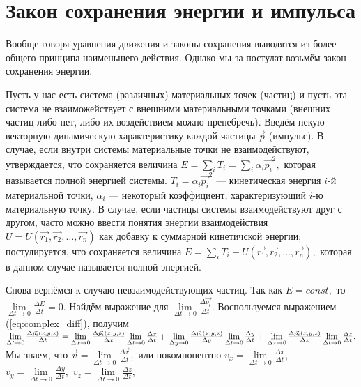\section{Закон сохранения энергии и импульса}
Вообще говоря уравнения движения и законы сохранения выводятся из более общего принципа
наименьшего действия. Однако мы за постулат возьмём закон сохранения энергии.\par
Пусть у нас есть система (различных) материальных точек (частиц) и пусть эта система не взаиможействует
с внешними материальными точками (внешних частиц либо нет, либо их воздействием можно
пренебречь). Введём некую векторную динамическую характеристику каждой частицы $\vec{p}$ (импульс).
В случае, если внутри системы материальные точки не взаимодействуют, утверждается, что
сохраняется величина $E = \sum\limits_{i} T_i = \sum\limits_{i} \alpha_i \vec{p_i}^2,$
которая называется полной энергией системы. $T_i = \alpha_i \vec{p_i}^2$ --- кинетическая
энергия $i$-й материальной точки, $\alpha_i$ --- некоторый коэффициент, характеризующий
$i$-ю материальную точку. В случае, если частицы системы взаимодействуют друг с другом,
часто можно ввести понятия энергии взаимодействия $U=U(\vec{r_1},\vec{r_2},\dots,\vec{r_n})$
как добавку к суммарной кинетичской энергии; постулируется, что сохраняется
величина $E = \sum\limits_{i} T_i + U(\vec{r_1},\vec{r_2},\dots,\vec{r_n}),$ которая в данном случае
называется полной энергией.\par
Снова вернёмся к случаю невзаимодействующих частиц.
Так как $E = const,$ то $\lim\limits_{\Delta t \to 0} \frac{\Delta E}{\Delta t} = 0.$
Найдём выражение для $\lim\limits_{\Delta t \to 0} \frac{\Delta \vec{p_i}}{\Delta t}.$
Воспользуемся выражением (\ref{eq:complex_diff}), получим
$\lim\limits_{\Delta t \to 0} \frac{\Delta \vec{p_i}(x,y,z)}{\Delta t} =
\lim\limits_{\Delta x \to 0} \frac{\Delta \vec{p_i}(x,y,z)}{\Delta x} 
\lim\limits_{\Delta t \to 0} \frac{\Delta x}{\Delta t}+ \\
\lim\limits_{\Delta y \to 0} \frac{\Delta \vec{p_i}(x,y,z)}{\Delta y} 
\lim\limits_{\Delta t \to 0} \frac{\Delta y}{\Delta t}+ \\
\lim\limits_{\Delta z \to 0} \frac{\Delta \vec{p_i}(x,y,z)}{\Delta z} 
\lim\limits_{\Delta t \to 0} \frac{\Delta z}{\Delta t}.$
Мы знаем, что
$\vec{v} = \lim\limits_{\Delta t \to 0} \frac{\Delta \vec{r}}{\Delta t},$
или покомпонентно
${v_x} = \lim\limits_{\Delta t \to 0} \frac{\Delta x}{\Delta t},$
${v_y} = \lim\limits_{\Delta t \to 0} \frac{\Delta y}{\Delta t},$
${v_z} = \lim\limits_{\Delta t \to 0} \frac{\Delta z}{\Delta t},$ 
